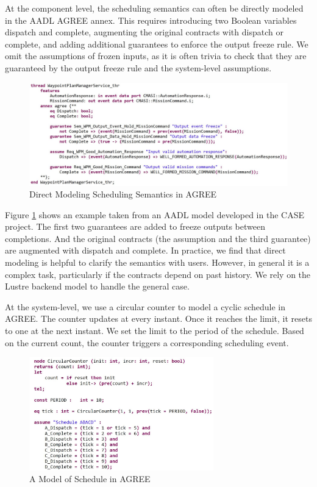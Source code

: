 At the component level, the scheduling semantics can often be directly modeled in the AADL AGREE annex. This requires introducing two Boolean variables dispatch and complete, augmenting the original contracts with dispatch or complete, and adding additional guarantees to enforce the output freeze rule. We omit the assumptions of frozen inputs, as it is often trivia to check that they are guaranteed by the output freeze rule and the system-level assumptions.

\begin{figure}[ht!]
\centering
\includegraphics[width=130mm]{wpmAGREE3.jpg}
\caption{Direct Modeling Scheduling Semantics in AGREE\label{wpmAGREE}}
\end{figure}

Figure \ref{wpmAGREE} shows an example taken from an AADL model developed in the CASE project. The first two guarantees are added to freeze outputs between completions. And the original contracts (the assumption and the third guarantee) are augmented with dispatch and complete.
In practice, we find that direct modeling is helpful to clarify the semantics with users. However, in general it is a complex task, particularly if the contracts depend on past history. We rely on the Lustre backend model to handle the general case.

At the system-level, we use a circular counter to model a cyclic schedule in AGREE. 
The counter updates at every instant. Once it reaches the limit, it resets to one at the next instant.
We set the limit to the period of the schedule. 
Based on the current count, the counter triggers a corresponding scheduling event.

\begin{figure}[ht!]
\centering
\includegraphics[width=80mm]{schedule.jpg}
\caption{A Model of Schedule in AGREE\label{schedule}}
\end{figure}

